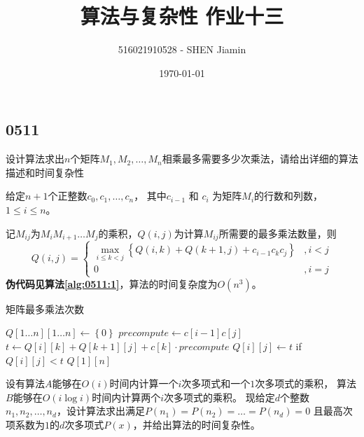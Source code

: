 \documentclass[answers]{exam}
\title{算法与复杂性 \quad 作业十三}
\author{516021910528 - SHEN Jiamin}
\date{\today}
\begin{document}
\maketitle

\begin{questions}
    \section{0511}\label{sec:0511}

    \question 设计算法求出$n$个矩阵$M_1, M_2, \dots ,M_n$相乘最多需要多少次乘法，请给出详细的算法描述和时间复杂性

    \begin{solution}
        给定$n+1$个正整数$c_0,c_1, \dots , c_{n}$，
        其中$c_{i-1}$ 和 $c_{i}$ 为矩阵$M_i$的行数和列数，$1 \le i \le n$。

        记$M_{ij}$为$M_iM_{i+1} \dots M_j$的乘积，$Q(i,j)$为计算$M_{ij}$所需要的最多乘法数量，则
        \[
            Q(i,j) = \begin{cases}
                \max_{i \le k < j}{ \left\{ Q(i, k) + Q(k+1, j) + c_{i-1} c_k c_{j} \right\} } & , i < j \\
                0                                                                              & , i = j
            \end{cases}
        \]
        \textbf{伪代码见算法\ref{alg:0511:1}}，算法的时间复杂度为$O(n^3)$。
    \end{solution}

    \begin{algorithm}[!ht]
        \caption{矩阵最多乘法次数}\label{alg:0511:1}
        \begin{algorithmic}[1]
            \State $Q[1 \dots n][1 \dots n] \gets \left\{0\right\}$
            \State $precompute \gets c[i-1]c[j]$
            \State $t \gets Q[i][k] + Q[k+1][j] + c[k] \cdot precompute$
            \State $Q[i][j] \gets t$ if $Q[i][j] < t$
            \EndFor
            \EndFor
            \EndFor
            \State \Return $Q[1][n]$
        \end{algorithmic}
    \end{algorithm}

    \question 设有算法$A$能够在$O(i)$时间内计算一个$i$次多项式和一个$1$次多项式的乘积，
    算法$B$能够在$O(i \log i)$时间内计算两个$i$次多项式的乘积。
    现给定$d$个整数$n_1,n_2, \dots ,n_d$，设计算法求出满足$P(n_1)=P(n_2)= \dots =P(n_d)=0$
    且最高次项系数为$1$的$d$次多项式$P(x)$，并给出算法的时间复杂性。


\end{questions}
\end{document}
